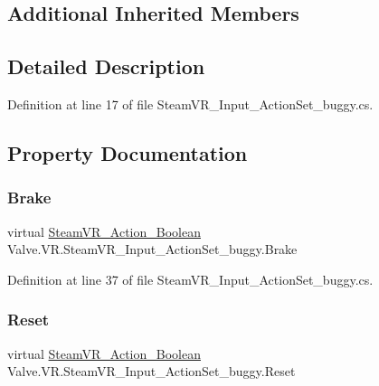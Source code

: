 \subsection*{Additional Inherited Members}


\subsection{Detailed Description}


Definition at line 17 of file Steam\+V\+R\+\_\+\+Input\+\_\+\+Action\+Set\+\_\+buggy.\+cs.



\subsection{Property Documentation}
\mbox{\label{class_valve_1_1_v_r_1_1_steam_v_r___input___action_set__buggy_a1441986d639b574dc0dc8f993db0a8a3}} 
\subsubsection{\texorpdfstring{Brake}{Brake}}
{\footnotesize\ttfamily virtual \mbox{\hyperlink{class_valve_1_1_v_r_1_1_steam_v_r___action___boolean}{Steam\+V\+R\+\_\+\+Action\+\_\+\+Boolean}} Valve.\+V\+R.\+Steam\+V\+R\+\_\+\+Input\+\_\+\+Action\+Set\+\_\+buggy.\+Brake\hspace{0.3cm}{\ttfamily [get]}}



Definition at line 37 of file Steam\+V\+R\+\_\+\+Input\+\_\+\+Action\+Set\+\_\+buggy.\+cs.

\mbox{\label{class_valve_1_1_v_r_1_1_steam_v_r___input___action_set__buggy_a1b1442d70fb8e37e12fdd3870c43bcb3}} 
\subsubsection{\texorpdfstring{Reset}{Reset}}
{\footnotesize\ttfamily virtual \mbox{\hyperlink{class_valve_1_1_v_r_1_1_steam_v_r___action___boolean}{Steam\+V\+R\+\_\+\+Action\+\_\+\+Boolean}} Valve.\+V\+R.\+Steam\+V\+R\+\_\+\+Input\+\_\+\+Action\+Set\+\_\+buggy.\+Reset\hspace{0.3cm}{\ttfamily [get]}}



